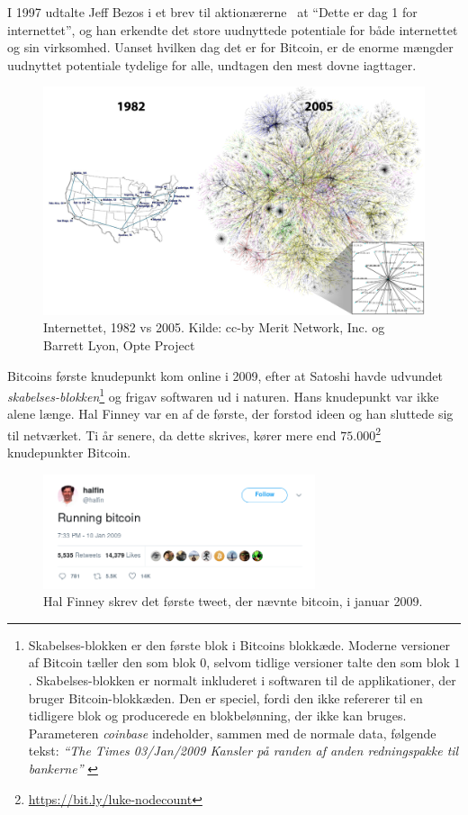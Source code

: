 \documentclass[paper=6in:9in,pagesize=pdftex,headinclude=on,footinclude=on,12pt]{scrbook}
\begin{document}
I 1997 udtalte Jeff Bezos i et brev til aktionærerne~\cite{bezos-letter} at \enquote{Dette er dag 1 for internettet}, og han erkendte det store uudnyttede potentiale for både internettet og sin virksomhed. Uanset hvilken dag det er for Bitcoin, er de enorme mængder uudnyttet potentiale tydelige for alle, undtagen den mest dovne iagttager.\begin{figure}
  \includegraphics{assets/images/internet-evolution-white-dates.png}
  \caption{Internettet, 1982 vs 2005. Kilde: cc-by Merit Network, Inc. og Barrett Lyon, Opte Project}
  \label{fig:internet-evolution-white-dates}
\end{figure}

Bitcoins første knudepunkt kom online i 2009, efter at Satoshi havde udvundet \textit{skabelses-blokken}\footnote{Skabelses-blokken er den første blok i Bitcoins blokkæde. Moderne versioner af Bitcoin tæller den som blok $0$, selvom tidlige versioner talte den som blok $1$. Skabelses-blokken er normalt inkluderet i softwaren til de applikationer, der bruger Bitcoin-blokkæden. Den er speciel, fordi den ikke refererer til en tidligere blok og producerede en blokbelønning, der ikke kan bruges. Parameteren \textit{coinbase} indeholder, sammen med de normale data, følgende tekst: \textit{\enquote{The Times 03/Jan/2009 Kansler på randen af anden redningspakke til bankerne}} \cite{btcwiki:genesis-block}} og frigav softwaren ud i naturen. Hans knudepunkt var ikke alene længe. Hal Finney var en af de første, der forstod ideen og han sluttede sig til netværket. Ti år senere, da dette skrives, kører mere end $75.000$\footnote{\url{https://bit.ly/luke-nodecount}} knudepunkter Bitcoin.\begin{figure}
  \centering
  \includegraphics[width=8cm]{assets/images/running-bitcoin.png}
  \caption{Hal Finney skrev det første tweet, der nævnte bitcoin, i januar 2009.}
  \label{fig:running-bitcoin}
\end{figure}
\end{document}
